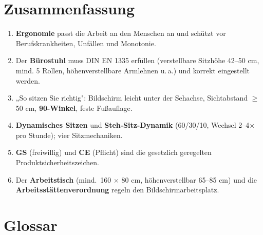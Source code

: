 \documentclass[11pt, a4paper]{article}
\begin{document}
\section{Zusammenfassung}

\begin{enumerate}
  \item \textbf{Ergonomie} passt die Arbeit an den Menschen an und schützt vor
    Berufskrankheiten, Unfällen und Monotonie.
  \item Der \textbf{Bürostuhl} muss DIN EN 1335 erfüllen (verstellbare Sitzhöhe 42--50 cm,
    mind. 5 Rollen, höhenverstellbare Armlehnen u.\,a.) und korrekt eingestellt werden.
  \item „So sitzen Sie richtig": Bildschirm leicht unter der Sehachse, Sichtabstand
    $\geq$ 50 cm, \textbf{90\textdegree-Winkel}, feste Fußauflage.
  \item \textbf{Dynamisches Sitzen} und \textbf{Steh-Sitz-Dynamik} (60/30/10, Wechsel
    2--4$\times$ pro Stunde); vier Sitzmechaniken.
  \item \textbf{GS} (freiwillig) und \textbf{CE} (Pflicht) sind die gesetzlich geregelten
    Produktsicherheitszeichen.
  \item Der \textbf{Arbeitstisch} (mind.\ 160 $\times$ 80 cm, höhenverstellbar 65--85 cm)
    und die \textbf{Arbeitsstättenverordnung} regeln den Bildschirmarbeitsplatz.
\end{enumerate}

\newpage

\section*{Glossar}





\end{document}
